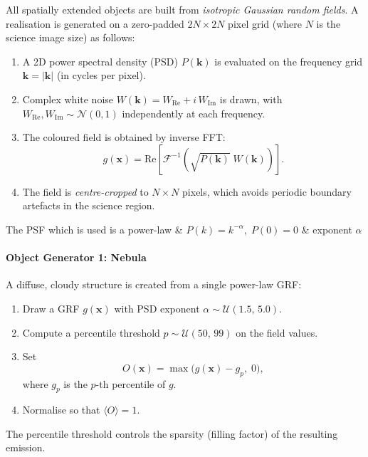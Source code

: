 \documentclass{aa}
\begin{document}
All spatially extended objects are built from \emph{isotropic Gaussian random fields}. A realisation is generated on a zero-padded $2N \times 2N$ pixel grid (where $N$ is the science image size) as follows:
\begin{enumerate}
    \item A 2D power spectral density (PSD) $P(\mathbf{k})$ is evaluated on the frequency grid $\mathbf{k} = |\mathbf{k}|$ (in cycles per pixel).
    \item Complex white noise $W(\mathbf{k}) = W_\mathrm{Re} + i\,W_\mathrm{Im}$ is drawn, with $W_\mathrm{Re}, W_\mathrm{Im} \sim \mathcal{N}(0,1)$ independently at each frequency.
    \item The coloured field is obtained by inverse FFT:
    \begin{equation}
    g(\mathbf{x}) = \mathrm{Re}\!\left[\mathcal{F}^{-1}\!\left(\sqrt{P(\mathbf{k})}\; W(\mathbf{k})\right)\right].
    \end{equation}
    \item The field is \emph{centre-cropped} to $N \times N$ pixels, which avoids periodic boundary artefacts in the science region.
\end{enumerate}


The PSF which is used is a power-law & $P(k) = k^{-\alpha}, \; P(0) = 0$ & exponent $\alpha$ \\

\paragraph{Object Generator 1: Nebula}

A diffuse, cloudy structure is created from a single power-law GRF:
\begin{enumerate}
    \item Draw a GRF $g(\mathbf{x})$ with PSD exponent $\alpha \sim \mathcal{U}(1.5,\,5.0)$.
    \item Compute a percentile threshold $p \sim \mathcal{U}(50,\,99)$ on the field values.
    \item Set
    \begin{equation}
    O(\mathbf{x}) = \max\!\bigl(g(\mathbf{x}) - g_p,\; 0\bigr),
    \end{equation}
    where $g_p$ is the $p$-th percentile of $g$.
    \item Normalise so that $\langle O \rangle = 1$.
\end{enumerate}

The percentile threshold controls the sparsity (filling factor) of the resulting emission.
\end{document}
